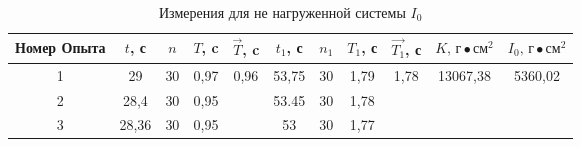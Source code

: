 \begin{table}[ht]
    \centering

    \begin{tabular}{|c|c|c|c|c|c|c|c|c|c|c|}
        \hline
        Номер Опыта & $t$, с & $n$ & $T$, c &  $\vec{T}$, c       & $t_1$, с & $n_1$ & $T_1$, с & $\vec{T_1}$, с        & $K \text{, г}\bullet\text{см}^2$ & $I_0\text{, г}\bullet\text{см}^2$ \\
        \hline
                  1 & 29     & 30  & 0,97   &\multirow{3}{*}{0,96}& 53,75    &  30   & 1,79     & \multirow{3}{*}{1,78} & \multirow{1}{*}{13067,38}        & \multirow{3}{*}{5360,02}          \\
        \hline
                  2 & 28,4   & 30  & 0,95   &                     & 53.45    &  30   & 1,78     &                       &                                  &                                   \\
        \hline
                  3 & 28,36  & 30  & 0,95   &                     & 53       &  30   & 1,77     &                       &                                  &                                   \\
        \hline
    \end{tabular}

    \caption{Измерения для не нагруженной системы $I_0$} \label{table-1}
\end{table}